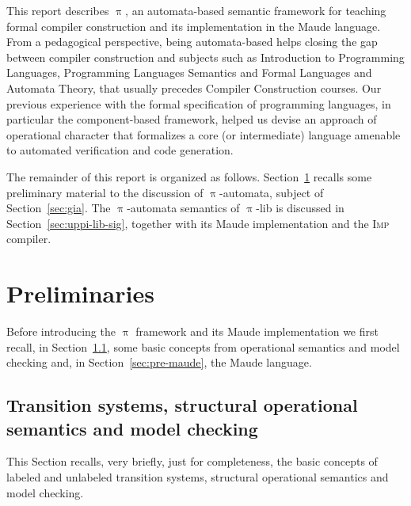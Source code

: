 \documentclass{llncs}%
\begin{document}
This report describes $\uppi$, an automata-based semantic framework for teaching formal compiler construction and its implementation in the Maude language. From a pedagogical perspective, being automata-based helps closing the gap between compiler construction and subjects such as Introduction to Programming Languages, Programming Languages Semantics and Formal Languages and Automata Theory, that usually precedes Compiler Construction courses. Our previous experience with the formal specification of programming languages, in particular the component-based framework, helped us devise an approach of operational character that formalizes a core (or intermediate) language amenable to automated verification and code generation. 

The remainder of this report is organized as follows. Section~\ref{sec:preliminaries} recalls some preliminary material to the discussion of $\uppi$-automata, subject of Section~\ref{sec:gia}. The $\uppi$-automata semantics of $\uppi$-lib is discussed in Section~\ref{sec:uppi-lib-sig}, together with its Maude implementation and the \textsc{Imp} compiler. 

\section{Preliminaries}\label{sec:preliminaries}

Before introducing the $\uppi$ framework and its Maude implementation we first recall, in Section~\ref{sec:pre-os}, some basic concepts from operational semantics and model checking and, in Section~\ref{sec:pre-maude}, the Maude language.

\subsection{Transition systems, structural operational semantics and model checking}\label{sec:pre-os}

This Section recalls, very briefly, just for completeness, the basic concepts of labeled and unlabeled transition systems, structural operational semantics and model checking.
\end{document}
